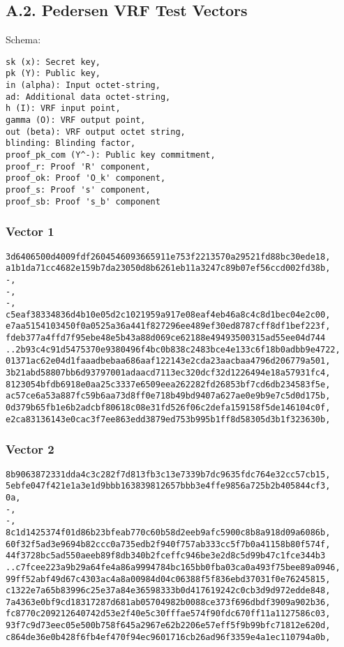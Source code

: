 \documentclass[
]{article}
\begin{document}
\subsection{A.2. Pedersen VRF Test
Vectors}\label{a.2.-pedersen-vrf-test-vectors}

Schema:

\begin{verbatim}
sk (x): Secret key,
pk (Y): Public key,
in (alpha): Input octet-string,
ad: Additional data octet-string,
h (I): VRF input point,
gamma (O): VRF output point,
out (beta): VRF output octet string,
blinding: Blinding factor,
proof_pk_com (Y^-): Public key commitment,
proof_r: Proof 'R' component,
proof_ok: Proof 'O_k' component,
proof_s: Proof 's' component,
proof_sb: Proof 's_b' component
\end{verbatim}

\subsubsection{Vector 1}\label{vector-1-1}

\begin{verbatim}
3d6406500d4009fdf2604546093665911e753f2213570a29521fd88bc30ede18,
a1b1da71cc4682e159b7da23050d8b6261eb11a3247c89b07ef56ccd002fd38b,
-,
-,
-,
c5eaf38334836d4b10e05d2c1021959a917e08eaf4eb46a8c4c8d1bec04e2c00,
e7aa5154103450f0a0525a36a441f827296ee489ef30ed8787cff8df1bef223f,
fdeb377a4ffd7f95ebe48e5b43a88d069ce62188e49493500315ad55ee04d744
..2b93c4c91d5475370e9380496f4bc0b838c2483bce4e133c6f18b0adbb9e4722,
01371ac62e04d1faaadbebaa686aaf122143e2cda23aacbaa4796d206779a501,
3b21abd58807bb6d93797001adaacd7113ec320dcf32d1226494e18a57931fc4,
8123054bfdb6918e0aa25c3337e6509eea262282fd26853bf7cd6db234583f5e,
ac57ce6a53a887fc59b6aa73d8ff0e718b49bd9407a627ae0e9b9e7c5d0d175b,
0d379b65fb1e6b2adcbf80618c08e31fd526f06c2defa159158f5de146104c0f,
e2ca83136143e0cac3f7ee863edd3879ed753b995b1ff8d58305d3b1f323630b,
\end{verbatim}

\subsubsection{Vector 2}\label{vector-2-1}

\begin{verbatim}
8b9063872331dda4c3c282f7d813fb3c13e7339b7dc9635fdc764e32cc57cb15,
5ebfe047f421e1a3e1d9bbb163839812657bbb3e4ffe9856a725b2b405844cf3,
0a,
-,
-,
8c1d1425374f01d86b23bfeab770c60b58d2eeb9afc5900c8b8a918d09a6086b,
60f32f5ad3e9694b82ccc0a735edb2f940f757ab333cc5f7b0a41158b80f574f,
44f3728bc5ad550aeeb89f8db340b2fceffc946be3e2d8c5d99b47c1fce344b3
..c7fcee223a9b29a64fe4a86a9994784bc165bb0fba03ca0a493f75bee89a0946,
99ff52abf49d67c4303ac4a8a00984d04c06388f5f836ebd37031f0e76245815,
c1322e7a65b83996c25e37a84e36598333b0d417619242c0cb3d9d972edde848,
7a4363e0bf9cd18317287d681ab05704982b0088ce373f696dbdf3909a902b36,
fc8770c209212640742d53e2f40e5c30fffae574f90fdc670ff11a1127586c03,
93f7c9d73eec05e500b758f645a2967e62b2206e57eff5f9b99bfc71812e620d,
c864de36e0b428f6fb4ef470f94ec9601716cb26ad96f3359e4a1ec110794a0b,
\end{verbatim}
\end{document}
